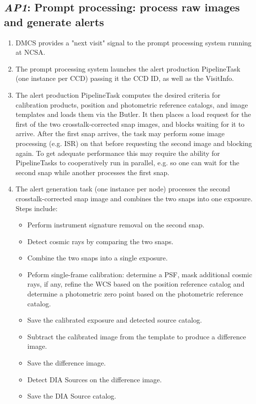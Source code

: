 \documentclass[DM,toc,lsstdraft]{lsstdoc}
\newcommand{\usecase}[3]{%
\subsection{\emph{#1}: #2}
\label{use:#1}
\begin{enumerate}[label=\alph*.]
#3
\end{enumerate}
}
\begin{document}
\usecase{AP1}{Prompt processing: process raw images and generate alerts}{%

\item
DMCS provides a "next visit" signal to the prompt processing system running at NCSA.

\item
The prompt processing system launches the alert production PipelineTask (one instance per CCD) passing it the CCD ID, as well as the VisitInfo.

\item
The alert production PipelineTask computes the desired criteria for calibration products, position and photometric reference catalogs, and image templates and loads them via the Butler.
It then places a load request for the first of the two crosstalk-corrected snap images, and blocks waiting for it to arrive.
After the first snap arrives, the task may perform some image processing (e.g. ISR) on that before requesting the second image and blocking again.
To get adequate performance this may require the ability for PipelineTasks to cooperatively run in parallel, e.g. so one can wait for the second snap while another processes the first snap.

\item
The alert generation task (one instance per node) processes the second crosstalk-corrected snap image and combines the two snaps into one exposure.
Steps include:
\begin{itemize}
\item Perform instrument signature removal on the second snap.
\item Detect cosmic rays by comparing the two snaps.
\item Combine the two snaps into a single exposure.
\item Peform single-frame calibration: determine a PSF, mask additional cosmic rays, if any, refine the WCS based on the position reference catalog and determine a photometric zero point based on the photometric reference catalog.
\item Save the calibrated exposure and detected source catalog.
\item Subtract the calibrated image from the template to produce a difference image.
\item Save the difference image.
\item Detect DIA Sources on the difference image.
\item Save the DIA Source catalog.
\end{itemize}

}
\end{document}
